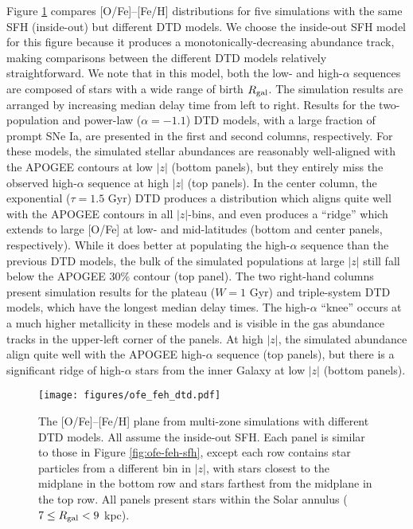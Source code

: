 \documentclass[twocolumn,twocolappendix,linenumbers,trackchanges]{aastex631}
\begin{document}
Figure \ref{fig:ofe-feh-dtd} compares [O/Fe]--[Fe/H] distributions for five simulations with the same SFH (inside-out) but different DTD models. We choose the inside-out SFH model for this figure because it produces a monotonically-decreasing abundance track, making comparisons between the different DTD models relatively straightforward. We note that in this model, both the low- and high-$\alpha$ sequences are composed of stars with a wide range of birth $R_{\rm gal}$. The simulation results are arranged by increasing median delay time from left to right. Results for the two-population and power-law ($\alpha=-1.1$) DTD models, with a large fraction of prompt SNe Ia, are presented in the first and second columns, respectively. For these models, the simulated stellar abundances are reasonably well-aligned with the APOGEE contours at low $|z|$ (bottom panels), but they entirely miss the observed high-$\alpha$ sequence at high $|z|$ (top panels). In the center column, the exponential ($\tau=1.5$ Gyr) DTD produces a distribution which aligns quite well with the APOGEE contours in all $|z|$-bins, and even produces a ``ridge'' which extends to large [O/Fe] at low- and mid-latitudes (bottom and center panels, respectively). While it does better at populating the high-$\alpha$ sequence than the previous DTD models, the bulk of the simulated populations at large $|z|$ still fall below the APOGEE 30\% contour (top panel). The two right-hand columns present simulation results for the plateau ($W=1$ Gyr) and triple-system DTD models, which have the longest median delay times. The high-$\alpha$ ``knee'' occurs at a much higher metallicity in these models and is visible in the gas abundance tracks in the upper-left corner of the panels. At high $|z|$, the simulated abundance align quite well with the APOGEE high-$\alpha$ sequence (top panels), but there is a significant ridge of high-$\alpha$ stars from the inner Galaxy at low $|z|$ (bottom panels).

\begin{figure*}
    \centering
    \texttt{[image: figures/ofe\_feh\_dtd.pdf]}
    \caption{The [O/Fe]--[Fe/H] plane from multi-zone simulations with different DTD models. All assume the inside-out SFH. Each panel is similar to those in Figure \ref{fig:ofe-feh-sfh}, except each row contains star particles from a different bin in $|z|$, with stars closest to the midplane in the bottom row and stars farthest from the midplane in the top row. All panels present stars within the Solar annulus ($7\leq R_{\rm gal}<9$ kpc).}
    \label{fig:ofe-feh-dtd}
\end{figure*}
\end{document}
